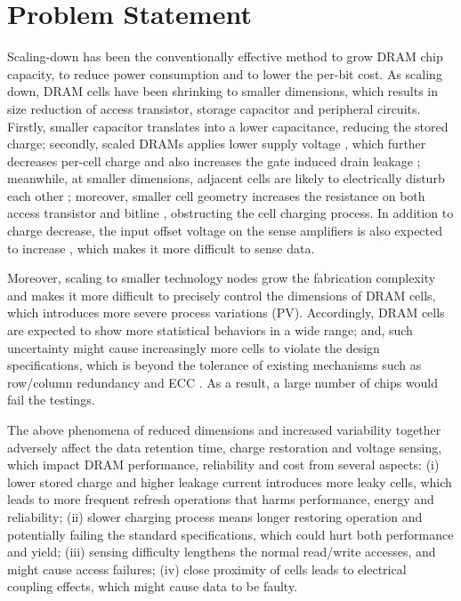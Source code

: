 \section{Problem Statement}
Scaling-down has been the conventionally effective method to grow DRAM chip capacity, to reduce power consumption and to lower the per-bit cost.
As scaling down, DRAM cells have been shrinking to smaller dimensions, which results in size reduction of access transistor, storage capacitor and peripheral circuits.
Firstly, smaller capacitor translates into a lower capacitance, reducing the stored charge; secondly, scaled DRAMs applies lower supply voltage \cite{ISCA13:ddr4, HPCA16:twr}, which further decreases per-cell charge and also increases the gate induced drain leakage \cite{ISCA13:archshield}; meanwhile, at smaller dimensions, adjacent cells are likely to electrically disturb each other \cite{ISCA14:disturbance};
moreover, smaller cell geometry increases the resistance on both access transistor and bitline \cite{ISCA13:ddr4, PATENT15:twr}, obstructing the cell charging process.
In addition to charge decrease, the input offset voltage on the sense amplifiers is also expected to increase \cite{HPCA16:twr, ISCA13:ddr4}, which makes it more difficult to sense data.

Moreover, scaling to smaller technology nodes grow the fabrication complexity and makes it more difficult to precisely control the dimensions of DRAM cells, which introduces more severe process variations (PV). Accordingly, DRAM cells are expected to show more statistical behaviors in a wide range; and, such uncertainty might cause increasingly more cells to violate the design specifications, which is beyond the tolerance of existing mechanisms such as row/column redundancy and ECC \cite{ISCA13:archshield}. 
As a result, a large number of chips would fail the testings.

The above phenomena of reduced dimensions and increased variability together adversely affect the data retention time, charge restoration and voltage sensing, which impact DRAM performance, reliability and cost from several aspects: (i) lower stored charge and higher leakage current introduces more leaky cells, which leads to more frequent refresh operations that harms performance, energy and reliability; (ii) slower charging process means longer restoring operation and potentially failing the standard specifications, which could hurt both performance and yield; (iii)  sensing difficulty lengthens the normal read/write accesses, and might cause access failures; (iv) close proximity of cells leads to electrical coupling effects, which might cause data to be faulty.


